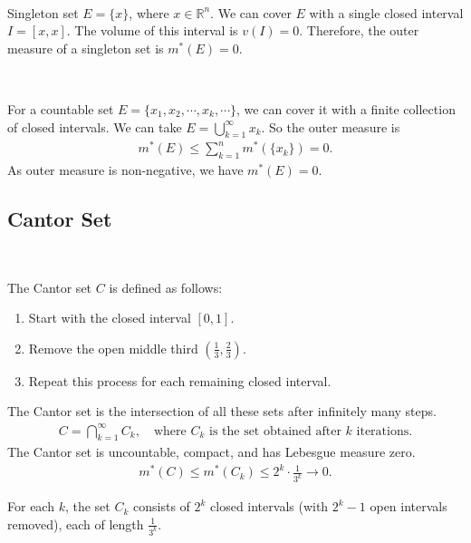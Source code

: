 \begin{eg}[Singleton]
    \

    Singleton set $E = \{x\}$, where $x \in \mathbb{R}^n$.
    We can cover $E$ with a single closed interval $I = [x, x]$.
    The volume of this interval is $v(I) = 0$.
    Therefore, the outer measure of a singleton set is $m^{*}(E) = 0$.
\end{eg}
\begin{eg}
    \

    For a countable set $E = \{x_1, x_2, \cdots, x_k, \cdots\}$,
    we can cover it with a finite collection of closed intervals.
    We can take $E = \bigcup_{k=1}^{\infty} {x_k}$.
    So the outer measure is
    \begin{gather*}
        m^{*}(E) \leq \sum_{k=1}^{n} m^{*}(\{x_k\}) = 0.
    \end{gather*}
    As outer measure is non-negative, we have $m^{*}(E) = 0$.
\end{eg}

\subsection{Cantor Set}
\begin{definition}\label{def:cantor_set}
    \

    The Cantor set $C$ is defined as follows:
    \begin{enumerate}
        \item Start with the closed interval $[0, 1]$.
        \item Remove the open middle third $(\frac{1}{3}, \frac{2}{3})$.
        \item Repeat this process for each remaining closed interval.
    \end{enumerate}
    The Cantor set is the intersection of all these sets after infinitely many steps.
    \begin{gather*}
        C = \bigcap_{k=1}^{\infty} C_k,
        \quad \text{where } C_k \text{ is the set obtained after } k \text{ iterations.}
    \end{gather*}
    The Cantor set is uncountable, compact, and has Lebesgue measure zero.
    \begin{gather*}
        m^*(C) \leq m^*(C_k) \leq 2^k \cdot \frac{1}{3^k} \to 0.
    \end{gather*}
\end{definition}

For each $k$, the set $C_k$ consists of $2^k$ closed intervals (with $2^k - 1$ open intervals removed),
each of length $\frac{1}{3^k}$.

